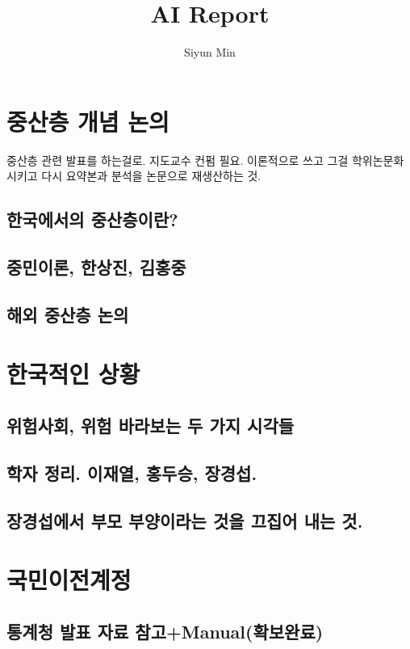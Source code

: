 \documentclass[11pt, a4paper]{article}
\begin{document}
\title{AI Report}
\author{Siyun Min}
\maketitle

\tableofcontents

\section{중산층 개념 논의}
중산층 관련 발표를 하는걸로. 지도교수 컨펌 필요. 이론적으로 쓰고 그걸 학위논문화시키고 다시 요약본과 분석을 논문으로 재생산하는 것.
\subsection{한국에서의 중산층이란?}

\subsection{중민이론, 한상진, 김홍중}

\subsection{해외 중산층 논의}

\section{한국적인 상황}

\subsection{위험사회, 위험 바라보는 두 가지 시각들}

\subsection{학자 정리. 이재열, 홍두승, 장경섭.}

\subsection{장경섭에서 부모 부양이라는 것을 끄집어 내는 것.}

\section{국민이전계정}
\subsection{통계청 발표 자료 참고+Manual(확보완료)}
\end{document}
